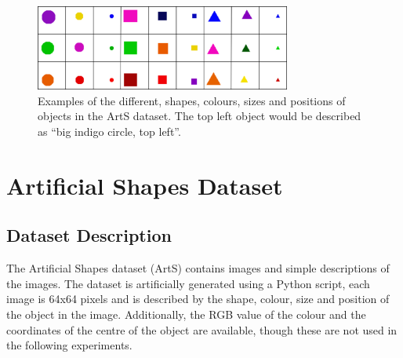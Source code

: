 \begin{figure}
\centering
\includegraphics[width=0.75\textwidth]{Figs/shapes/shapes.png}
\caption{Examples of the different, shapes, colours, sizes and positions of objects in the ArtS dataset. The top left object would be described as ``big indigo circle, top left''.}
\label{fig:shapes}
\end{figure}

\newpage
\section{Artificial Shapes Dataset}
\subsection{Dataset Description}
The Artificial Shapes dataset (ArtS) contains images and simple descriptions of the images. The dataset is artificially generated using a Python script, each image is 64x64 pixels and is described by the shape, colour, size and position of the object in the image. Additionally, the RGB value of the colour and the coordinates of the centre of the object are available, though these are not used in the following experiments. 

